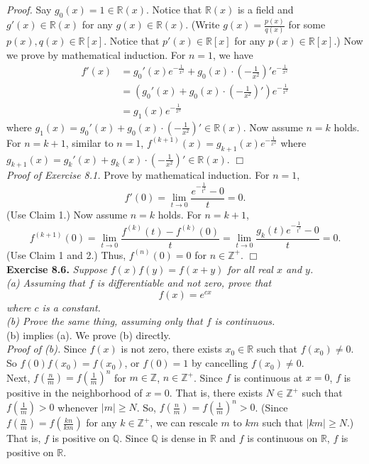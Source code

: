 \documentclass{article}
\begin{document}
\emph{Proof.}
Say $g_0(x) = 1 \in \mathbb{R}(x)$.
Notice that $\mathbb{R}(x)$ is a field and
$g'(x) \in \mathbb{R}(x)$ for any $g(x) \in \mathbb{R}(x)$.
(Write $g(x) = \frac{p(x)}{q(x)}$ for some $p(x), q(x) \in \mathbb{R}[x]$.
Notice that $p'(x) \in \mathbb{R}[x]$ for any $p(x) \in \mathbb{R}[x]$.)
Now we prove by mathematical induction.
For $n = 1$, we have
\begin{align*}
f'(x)
&= g_0'(x) e^{-\frac{1}{x^2}}
+ g_0(x) \cdot \left( -\frac{1}{x^2} \right)' e^{-\frac{1}{x^2}} \\
&= \left( g_0'(x) + g_0(x) \cdot \left( -\frac{1}{x^2} \right)' \right) e^{-\frac{1}{x^2}} \\
&= g_1(x) e^{-\frac{1}{x^2}}
\end{align*}
where $g_1(x) = g_0'(x) + g_0(x) \cdot (-\frac{1}{x^2})' \in \mathbb{R}(x)$.
Now assume $n = k$ holds.
For $n = k + 1$, similar to $n = 1$,
$f^{(k + 1)}(x) = g_{k + 1}(x) e^{-\frac{1}{x^2}}$
where $g_{k + 1}(x) = g_k'(x) + g_k(x) \cdot (-\frac{1}{x^2})' \in \mathbb{R}(x)$.
$\Box$ \\

\emph{Proof of Exercise 8.1.}
Prove by mathematical induction.
For $n = 1$,
$$f'(0) = \lim_{t \rightarrow 0} \frac{e^{- \frac{1}{t^2}} - 0}{t} = 0.$$
(Use Claim 1.)
Now assume $n = k$ holds.
For $n = k + 1$,
$$f^{(k + 1)}(0)
= \lim_{t \rightarrow 0} \frac{f^{(k)}(t) - f^{(k)}(0)}{t}
= \lim_{t \rightarrow 0} \frac{g_k(t) e^{- \frac{1}{t^2}} - 0}{t} = 0.$$
(Use Claim 1 and 2.)
Thus, $f^{(n)}(0) = 0$ for $n \in \mathbb{Z}^+$.
$\Box$ \\



\textbf{Exercise 8.6.}
\emph{Suppose $f(x)f(y) = f(x + y)$ for all real $x$ and $y$. \\
(a) Assuming that $f$ is differentiable and not zero, prove that
$$f(x) = e^{cx}$$
where $c$ is a constant. \\
(b) Prove the same thing, assuming only that $f$ is continuous.} \\

(b) implies (a). We prove (b) directly. \\

\emph{Proof of (b).}
Since $f(x)$ is not zero, there exists $x_0 \in \mathbb{R}$ such that $f(x_0) \neq 0$.
So $f(0)f(x_0) = f(x_0)$, or $f(0) = 1$ by cancelling $f(x_0) \neq 0$. \\

Next, $f(\frac{n}{m}) = f(\frac{1}{m})^n$ for $m \in \mathbb{Z}$, $n \in \mathbb{Z}^{+}$.
Since $f$ is continuous at $x = 0$, $f$ is positive in the neighborhood of $x = 0$.
That is, there exists $N \in \mathbb{Z}^{+}$ such that $f(\frac{1}{m}) > 0$
whenever $|m| \geq N$.
So, $f(\frac{n}{m}) = f(\frac{1}{m})^n > 0$.
(Since $f(\frac{n}{m}) = f(\frac{kn}{km})$ for any $k \in \mathbb{Z}^{+}$,
we can rescale $m$ to $km$ such that $|km| \geq N$.)
That is, $f$ is positive on $\mathbb{Q}$.
Since $\mathbb{Q}$ is dense in $\mathbb{R}$ and $f$ is continuous on $\mathbb{R}$,
$f$ is positive on $\mathbb{R}$. \\
\end{document}

